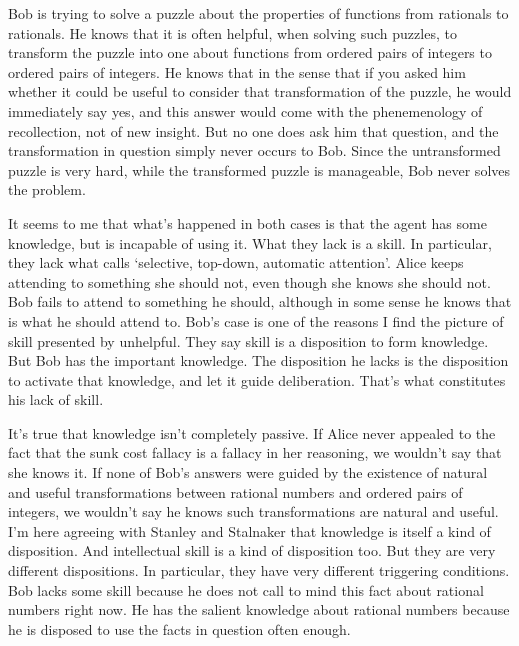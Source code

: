 Bob is trying to solve a puzzle about the properties of functions from rationals to rationals. He knows that it is often helpful, when solving such puzzles, to transform the puzzle into one about functions from ordered pairs of integers to ordered pairs of integers. He knows that in the sense that if you asked him whether it could be useful to consider that transformation of the puzzle, he would immediately say yes, and this answer would come with the phenemenology of recollection, not of new insight. But no one does ask him that question, and the transformation in question simply never occurs to Bob. Since the untransformed puzzle is very hard, while the transformed puzzle is manageable, Bob never solves the problem. 

It seems to me that what's happened in both cases is that the agent has some knowledge, but is incapable of using it. What they lack is a skill. In particular, they lack what \citet[2746]{Fridland2014} calls `selective, top-down, automatic attention'. Alice keeps attending to something she should not, even though she knows she should not. Bob fails to attend to something he should, although in some sense he knows that is what he should attend to. Bob's case is one of the reasons I find the picture of skill presented by \citet{StanleyWilliamson2016} unhelpful. They say skill is a disposition to form knowledge. But Bob has the important knowledge. The disposition he lacks is the disposition to activate that knowledge, and let it guide deliberation. That's what constitutes his lack of skill.

It's true that knowledge isn't completely passive. If Alice never appealed to the fact that the sunk cost fallacy is a fallacy in her reasoning, we wouldn't say that she knows it. If none of Bob's answers were guided by the existence of natural and useful transformations between rational numbers and ordered pairs of integers, we wouldn't say he knows such transformations are natural and useful. I'm here agreeing with Stanley and Stalnaker that knowledge is itself a kind of disposition. And intellectual skill is a kind of disposition too. But they are very different dispositions. In particular, they have very different triggering conditions. Bob lacks some skill because he does not call to mind this fact about rational numbers right now. He has the salient knowledge about rational numbers because he is disposed to use the facts in question often enough. 


